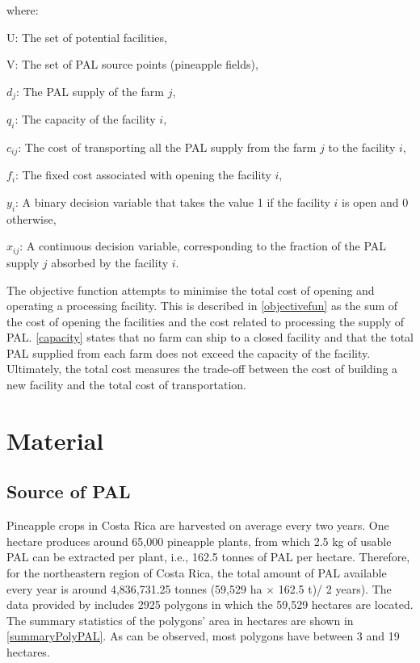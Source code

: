 where:
\begin{description}

    \item U: The set of potential facilities,
    
    \item V: The set of PAL source points (pineapple fields),
    
    \item $d_j$: The PAL supply of the farm $j$,
    
    \item $q_i$: The capacity of the facility $i$,
    
    \item $c_{ij}$: The cost of transporting all the PAL supply from the farm $j$ to the facility $i$, 
    
    \item $f_i$: The fixed cost associated with opening the facility $i$,
    
    \item $y_i$: A binary decision variable that takes the value 1 if the facility $i$ is open and 0 otherwise,
    
    \item $x_{ij}$: A continuous decision variable, corresponding to the fraction of the PAL supply $j$ absorbed by the facility $i$.
    
\end{description}

The objective function attempts to minimise the total cost of opening and operating a processing facility. This is described in \cref{objectivefun} as the sum of the cost of opening the facilities and the cost related to processing the supply of PAL. \cref{capacity} states that no farm can ship to a closed facility and that the total PAL supplied from each farm does not exceed the capacity of the facility. Ultimately, the total cost measures the trade-off between the cost of building a new facility and the total cost of transportation.  


\section{Material}

\subsection{Source of PAL}

Pineapple crops in Costa Rica are harvested on average every two years. One hectare produces around 65,000 pineapple plants, from which 2.5 kg of usable PAL can be extracted per plant, i.e., 162.5 tonnes of PAL per hectare. Therefore, for the northeastern region of Costa Rica, the total amount of PAL available every year is around 4,836,731.25 tonnes (59,529 ha $\times$ 162.5 t)/ 2 years). The data provided by \citeauthor{SNITpina} includes 2925 polygons in which the 59,529 hectares are located. The summary statistics of the polygons' area in hectares are shown in \cref{summaryPolyPAL}. As can be observed, most polygons have between 3 and 19 hectares. 


